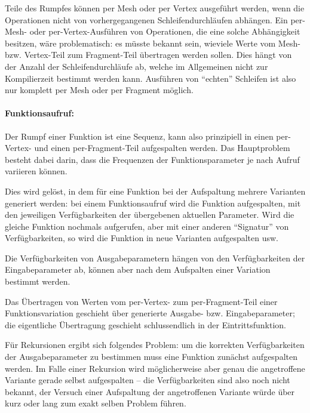 \documentclass[twoside,a4paper,fleqn,12pt]{book}
\begin{document}
Teile des Rumpfes können per Mesh oder per Vertex ausgeführt werden, wenn die Operationen nicht von vorhergegangenen Schleifendurchläufen
abhängen. Ein per-Mesh- oder per-Vertex-Ausführen von Operationen, die eine solche Abhängigkeit besitzen, wäre problematisch: es müsste bekannt sein, wieviele Werte vom
Mesh- bzw. Vertex-Teil zum Fragment-Teil übertragen werden sollen. Dies hängt von der Anzahl der Schleifendurchläufe ab,
welche im Allgemeinen nicht zur Kompilierzeit bestimmt werden kann.
Ausführen von "`echten"' Schleifen ist also nur komplett per Mesh oder per Fragment möglich.

\paragraph{Funktionsaufruf:} Der Rumpf einer Funktion ist eine Sequenz, kann also prinzipiell in einen per-Vertex- und einen per-Fragment-Teil aufgespalten werden.
Das Hauptproblem besteht dabei darin, dass die Frequenzen der Funktionsparameter je nach Aufruf variieren können.

Dies wird gelöst, in dem für eine Funktion bei der Aufspaltung mehrere Varianten generiert werden: bei einem Funktionsaufruf
wird die Funktion aufgespalten, mit den jeweiligen Verfügbarkeiten der übergebenen aktuellen Parameter. Wird die gleiche Funktion
nochmals aufgerufen, aber mit einer anderen "`Signatur"' von Verfügbarkeiten, so wird die Funktion in neue Varianten aufgespalten usw.

Die Verfügbarkeiten von Ausgabeparametern hängen von den Verfügbarkeiten der Eingabeparameter ab, können aber nach dem Aufspalten
einer Variation bestimmt werden.

Das Übertragen von Werten vom per-Vertex- zum per-Fragment-Teil einer Funktionsvariation geschieht über generierte Ausgabe- bzw.
Eingabeparameter; die eigentliche Übertragung geschieht schlussendlich in der Eintrittsfunktion.

Für Rekursionen ergibt sich folgendes Problem:
um die korrekten Verfügbarkeiten der Ausgabeparameter zu bestimmen
muss eine Funktion zunächst aufgespalten werden. Im Falle einer Rekursion wird möglicherweise aber genau die angetroffene
Variante gerade selbst aufgespalten -- die Verfügbarkeiten sind also noch nicht bekannt, der Versuch einer Aufspaltung der
angetroffenen Variante würde über kurz oder lang zum exakt selben Problem führen.
\end{document}
